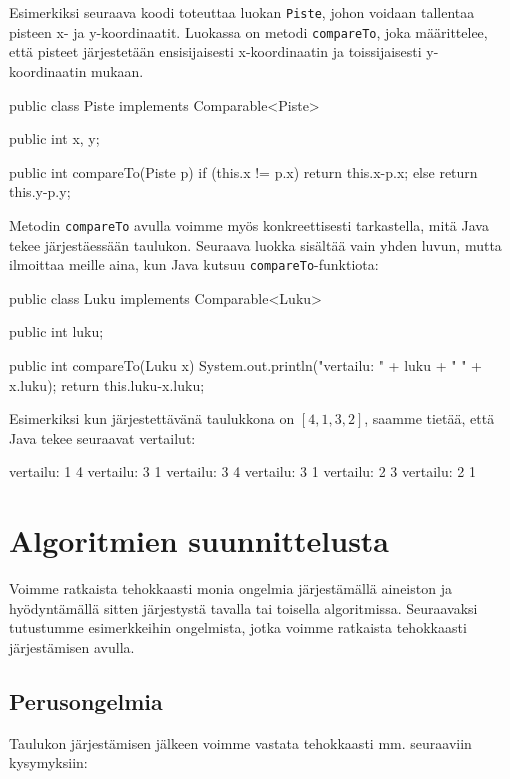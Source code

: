 Esimerkiksi seuraava koodi toteuttaa luokan \texttt{Piste},
johon voidaan tallentaa pisteen x- ja y-koordinaatit.
Luokassa on metodi \texttt{compareTo}, joka määrittelee,
että pisteet järjestetään ensisijaisesti x-koordinaatin ja
toissijaisesti y-koordinaatin mukaan.

\begin{code}
public class Piste implements Comparable<Piste> {
    public int x, y;

    public int compareTo(Piste p) {
        if (this.x != p.x) return this.x-p.x;
        else return this.y-p.y;
    }
}
\end{code}

Metodin \texttt{compareTo} avulla voimme myös konkreettisesti
tarkastella, mitä Java tekee järjestäessään taulukon.
Seuraava luokka sisältää vain yhden luvun,
mutta ilmoittaa meille aina, kun Java kutsuu
\texttt{compareTo}-funktiota:

\begin{code}
public class Luku implements Comparable<Luku> {
    public int luku;

    public int compareTo(Luku x) {
        System.out.println("vertailu: " + luku + " " + x.luku);
        return this.luku-x.luku;
    }
}
\end{code}

Esimerkiksi kun järjestettävänä taulukkona on $[4,1,3,2]$,
saamme tietää, että Java tekee seuraavat vertailut:

\begin{code}
vertailu: 1 4
vertailu: 3 1
vertailu: 3 4
vertailu: 3 1
vertailu: 2 3
vertailu: 2 1
\end{code}

\section{Algoritmien suunnittelusta}

Voimme ratkaista tehokkaasti monia ongelmia järjestämällä
aineiston ja hyö\-dyntämällä sitten järjestystä tavalla tai toisella
algoritmissa.
Seuraavaksi tutustumme esimerkkeihin ongelmista, jotka voimme
ratkaista tehokkaasti järjes\-tämisen avulla.

\subsection{Perusongelmia}

Taulukon järjestämisen jälkeen voimme vastata tehokkaasti
mm. seuraaviin kysymyksiin:

